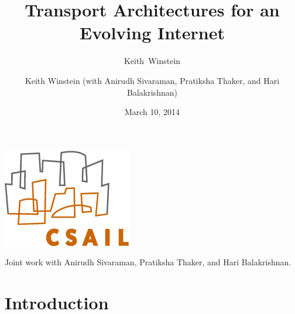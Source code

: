 \documentclass[svgnames]{beamer}
\title{Transport Architectures for an Evolving Internet}
\author{Keith~Winstein}
\institute{MIT Computer Science and Artificial Intelligence Laboratory\\\vspace{\baselineskip}\textcolor{DarkBlue}{}}
\date{March 10, 2014}
\begin{document}
\begin{frame}[plain]

\titlepage

\begin{centering}

\includegraphics[width=2 cm]{csaillogomed.png}

\vspace{\baselineskip}
\vspace{\baselineskip}

\tiny Joint work with Anirudh Sivaraman, Pratiksha Thaker, and Hari Balakrishnan.

\end{centering}

\end{frame}

\author{Keith Winstein (with Anirudh Sivaraman, Pratiksha Thaker, and Hari Balakrishnan)}

\institute{}

\section{Introduction}
\end{document}
